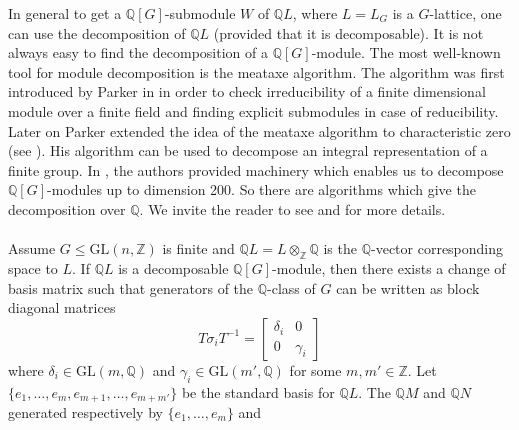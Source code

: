 \documentclass{article}
\theoremstyle{plain}
\theoremstyle{definition}
\newcommand{\Z}{\ensuremath{\mathbb{Z}}}
\newcommand{\Q}{\ensuremath{\mathbb{Q}}}
\begin{document}
\noindent
In general to get a $\Q[G]$-submodule $W$ of $\Q L$, where $L = L_G$ is a $G$-lattice, one can use the decomposition of $\Q L$ (provided that it is decomposable). It is not always easy to find the decomposition of a $\Q[G]$-module. The most well-known tool for module decomposition is the meataxe algorithm. The algorithm was first introduced by Parker in \cite{Parker} in order to check irreducibility of a finite dimensional module over a finite field and finding explicit submodules in case of reducibility. Later on Parker extended the idea of the meataxe algorithm to characteristic zero (see \cite{Parker2}). His algorithm can be used to decompose an integral representation of a finite group. In \cite{Plesken2}, the authors provided machinery which enables us to decompose $\Q[G]$-modules up to dimension 200. So there are algorithms which give the decomposition over $\Q$. We invite the reader to see \cite{Lux} and \cite{Holt} for more details. \\
\\
Assume $G \leq \mathrm{GL}(n,\Z)$ is finite and $\Q L = L \otimes_{\Z} \Q$ is the $\Q$-vector corresponding space to $L$. If $\Q L$ is a decomposable $\Q[G]$-module, then there exists a change of basis matrix such that generators of the $\Q$-class of $G$ can be written as block diagonal matrices
$$
T \sigma_i T^{-1} =  \left[ \begin{array}{c|c}
\delta_i & 0 \\
\hline
0 & \gamma_i
\end{array} \right]
$$
where $\delta_i	\in \mathrm{GL}(m,\Q)$ and $ \gamma_i \in \mathrm{GL}(m',\Q)$ for some $m, m' \in \Z$. Let $\lbrace e_1, \ldots, e_m, e_{m+1}, \ldots , e_{m+m'}\rbrace$ be the standard basis for $\Q L$. The $\Q M$ and $\Q N$ generated respectively by $\lbrace e_1, \ldots, e_m \rbrace$ and 
\end{document}
